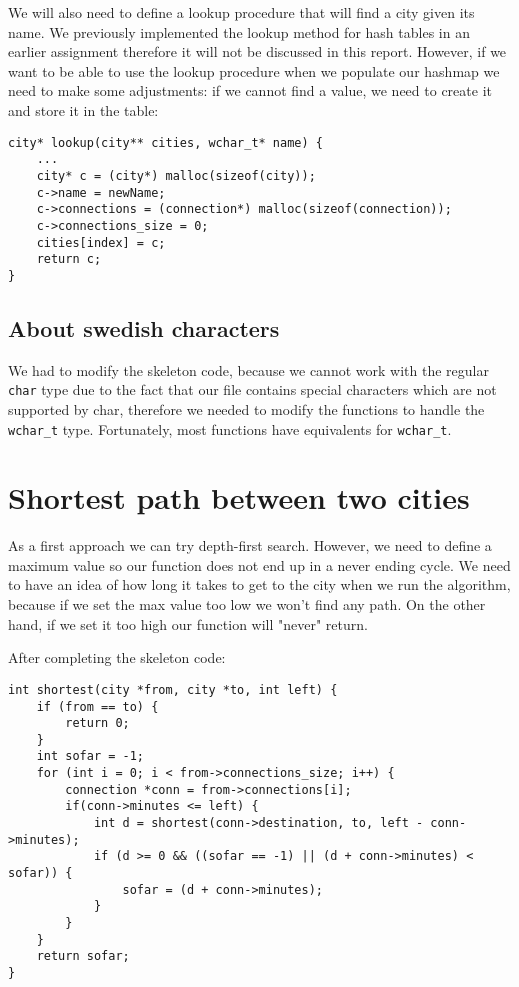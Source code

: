 \documentclass[a4paper,11pt]{article}
\begin{document}
    We will also need to define a lookup procedure that will find a city given its name.
    We previously implemented the lookup method for hash tables in an earlier assignment therefore it will not be discussed in this report.
    However, if we want to be able to use the lookup procedure when we populate our hashmap we need to make some adjustments: if we cannot find a value, we need to create it and store it in the table:

    \begin{verbatim}
city* lookup(city** cities, wchar_t* name) {
    ...
    city* c = (city*) malloc(sizeof(city));
    c->name = newName;
    c->connections = (connection*) malloc(sizeof(connection));
    c->connections_size = 0;
    cities[index] = c;
    return c;
}
    \end{verbatim}

    \subsection*{About swedish characters}

    We had to modify the skeleton code, because we cannot work with the regular {\tt char} type due to the fact that our file contains special characters which are not supported by char, therefore we needed to modify the functions to handle the {\tt wchar\_t} type.
    Fortunately, most functions have equivalents for {\tt wchar\_t}.

    \section*{Shortest path between two cities}

    As a first approach we can try depth-first search.
    However, we need to define a maximum value so our function does not end up in a never ending cycle.
    We need to have an idea of how long it takes to get to the city when we run the algorithm, because if we set the max value too low we won't find any path.
    On the other hand, if we set it too high our function will "never" return.

    After completing the skeleton code:

    \begin{verbatim}
int shortest(city *from, city *to, int left) {
    if (from == to) {
        return 0;
    }
    int sofar = -1;
    for (int i = 0; i < from->connections_size; i++) {
        connection *conn = from->connections[i];
        if(conn->minutes <= left) {
            int d = shortest(conn->destination, to, left - conn->minutes);
            if (d >= 0 && ((sofar == -1) || (d + conn->minutes) < sofar)) {
                sofar = (d + conn->minutes);
            }
        }
    }
    return sofar;
}
    \end{verbatim}
\end{document}
